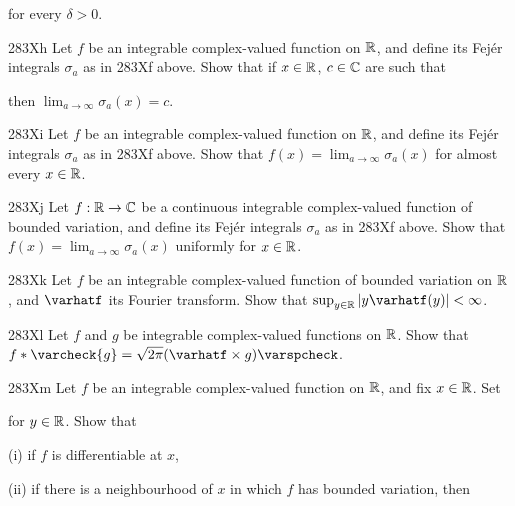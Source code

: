 {

\noindent for every $\delta>0$.


\spheader 283Xh Let $f$ be an integrable complex-valued function
on $\Bbb R$, and define its Fej\'er integrals $\sigma_a$ as in 283Xf
above.   Show that if $x\in\Bbb R$, $c\in\Bbb C$ are such that


\noindent then $\lim_{a\to\infty}\sigma_a(x)=c$.   

\sqheader 283Xi Let $f$ be an integrable complex-valued function
on $\Bbb R$, and define its Fej\'er integrals $\sigma_a$ as in 283Xf
above.   Show that $f(x)=\lim_{a\to\infty}\sigma_a(x)$ for almost every
$x\in\Bbb R$.

\spheader 283Xj Let $f:\Bbb R\to\Bbb C$ be a continuous integrable
complex-valued function of bounded variation, and define its Fej\'er
integrals $\sigma_a$ as in 283Xf above.   Show that
$f(x)=\lim_{a\to\infty}\sigma_a(x)$ uniformly for $x\in\Bbb R$.

\sqheader 283Xk Let $f$ be an integrable complex-valued function
of bounded variation on $\Bbb R$, and $\varhatf$ its Fourier transform.
Show that $\sup_{y\in\Bbb R}|y\varhatf(y)|<\infty$.

\spheader 283Xl Let $f$ and $g$ be integrable complex-valued
functions on $\Bbb R$.   Show that
$f*\varcheck{g}=\sqrt{2\pi}(\varhatf\times g)\varspcheck$.

\spheader 283Xm Let $f$ be an integrable complex-valued function
on $\Bbb R$, and fix $x\in\Bbb R$.    Set


\noindent for $y\in\Bbb R$.   Show that

\quad (i) if $f$ is differentiable at $x$,


\quad (ii) if there is a neighbourhood of $x$ in which $f$ has bounded
variation, then


}
